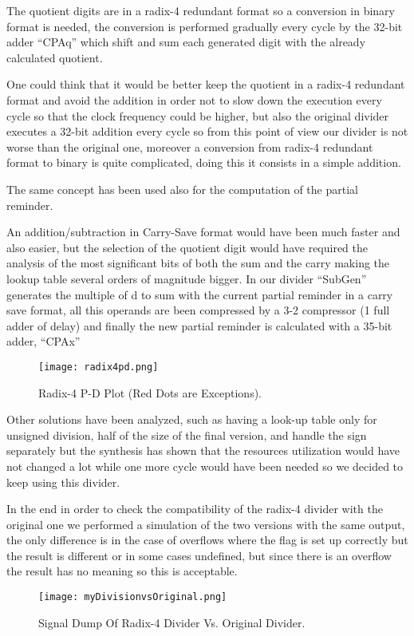 The quotient digits are in a radix-4 redundant format so a conversion in binary format is needed,
the conversion is performed gradually every cycle by the 32-bit adder ``CPAq'' which shift and sum
each generated digit with the already calculated quotient.

One could think that it would be better keep the quotient in a radix-4 redundant format and avoid
the addition in order not to slow down the execution every cycle so that the clock frequency could
be higher, but also the original divider executes a 32-bit addition every cycle so from this point of
view our divider is not worse than the original one, moreover a conversion from radix-4 redundant
format to binary is quite complicated, doing this it consists in a simple addition.

The same concept has been used also for the computation of the partial reminder.

An addition/subtraction in Carry-Save format would have been much faster and also easier, but
the selection of the quotient digit would have required the analysis of the most significant bits of
both the sum and the carry making the lookup table several orders of magnitude bigger.
In our divider ``SubGen'' generates the multiple of d to sum with the current partial reminder in a
carry save format, all this operands are been compressed by a 3-2 compressor (1 full adder of
delay) and finally the new partial reminder is calculated with a 35-bit adder, ``CPAx''

\begin{figure}[H]
\centering
\texttt{[image: radix4pd.png]}
\caption{Radix-4 P-D Plot (Red Dots are Exceptions).}
\label{fig:div_pd_plot}
\end{figure}

Other solutions have been analyzed, such as having a look-up table only for unsigned division, half
of the size of the final version, and handle the sign separately but the synthesis has shown that the
resources utilization would have not changed a lot while one more cycle would have been needed
so we decided to keep using this divider.

In the end in order to check the compatibility of the radix-4 divider with the original one we
performed a simulation of the two versions with the same output, the only difference is in the
case of overflows where the flag is set up correctly but the result is different or in some cases
undefined, but since there is an overflow the result has no meaning so this is acceptable.

\begin{figure}[H]
\centering
\texttt{[image: myDivisionvsOriginal.png]}
\caption{Signal Dump Of Radix-4 Divider Vs. Original Divider.}
\label{fig:mul32_wave}
\end{figure}
